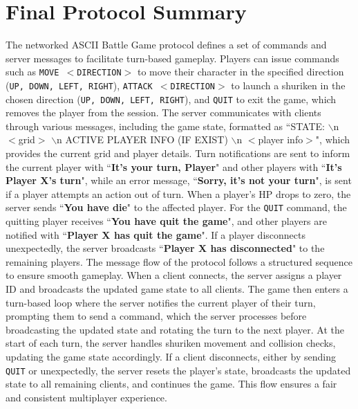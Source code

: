 \documentclass{article}
\begin{document}
\section*{Final Protocol Summary}
The networked ASCII Battle Game protocol defines a set of commands and server messages to facilitate turn-based gameplay. Players can issue commands such as \texttt{MOVE $<$DIRECTION$>$} to move their character in the specified direction (\texttt{UP, DOWN, LEFT, RIGHT}), \texttt{ATTACK $<$DIRECTION$>$} to launch a shuriken in the chosen direction (\texttt{UP, DOWN, LEFT, RIGHT}), and \texttt{QUIT} to exit the game, which removes the player from the session. 
\newline
\newline
The server communicates with clients through various messages, including the game state, formatted as ``STATE: $\backslash$n $<$grid$>$ $\backslash$n ACTIVE PLAYER INFO (IF EXIST) $\backslash$n $<$player info$>$", which provides the current grid and player details. 
\newline
\newline
Turn notifications are sent to inform the current player with ``\textbf{It's your turn, Player}" and other players with ``\textbf{It's Player X's turn}", while an error message, ``\textbf{Sorry, it's not your turn}", is sent if a player attempts an action out of turn. 
\newline
\newline
When a player's HP drops to zero, the server sends ``\textbf{You have die}" to the affected player. For the \texttt{QUIT} command, the quitting player receives ``\textbf{You have quit the game}", and other players are notified with ``\textbf{Player X has quit the game}". If a player disconnects unexpectedly, the server broadcasts ``\textbf{Player X has disconnected}" to the remaining players.
\newline
\newline
The message flow of the protocol follows a structured sequence to ensure smooth gameplay. When a client connects, the server assigns a player ID and broadcasts the updated game state to all clients. The game then enters a turn-based loop where the server notifies the current player of their turn, prompting them to send a command, which the server processes before broadcasting the updated state and rotating the turn to the next player. At the start of each turn, the server handles shuriken movement and collision checks, updating the game state accordingly. If a client disconnects, either by sending \texttt{QUIT} or unexpectedly, the server resets the player's state, broadcasts the updated state to all remaining clients, and continues the game. This flow ensures a fair and consistent multiplayer experience.
\end{document}
